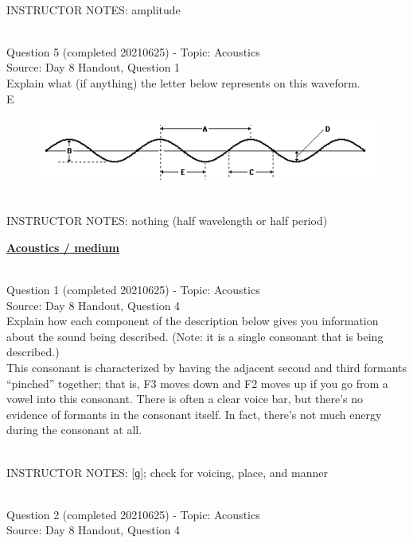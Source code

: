 \documentclass[12pt]{article}
\begin{document}
~\\
INSTRUCTOR NOTES: amplitude


~\\

{\large Question 5} (completed 20210625) - Topic: Acoustics\\
Source: Day 8 Handout, Question 1\\

Explain what (if anything) the letter below represents on this waveform.\\

E

\begin{figure}[H]
\includegraphics{../images/sinusoid.png}
\end{figure}

~\\
INSTRUCTOR NOTES: nothing (half wavelength or half period)


\newpage\textbf{\underline{\huge Acoustics / medium\\}}

~\\

{\large Question 1} (completed 20210625) - Topic: Acoustics\\
Source: Day 8 Handout, Question 4\\

Explain how each component of the description below gives you information about the sound being described. (Note: it is a single consonant that is being described.)\\

This consonant is characterized by having the adjacent second and third formants “pinched” together; that is, F3 moves down and F2 moves up if you go from a vowel into this consonant. There is often a clear voice bar, but there’s no evidence of formants in the consonant itself. In fact, there’s not much energy during the consonant at all.


~\\
INSTRUCTOR NOTES: [ɡ]; check for voicing, place, and manner


~\\

{\large Question 2} (completed 20210625) - Topic: Acoustics\\
Source: Day 8 Handout, Question 4\\
\end{document}
